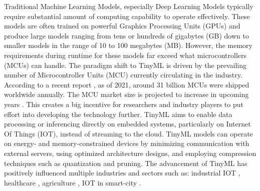 \documentclass[twocolumn]{article}
\begin{document}
Traditional Machine Learning Models, especially Deep Learning Models typically require substantial amount of computing capability to operate effectively. These models are often trained on powerful Graphics Processing Units (GPUs) and produce large models ranging from tens or hundreds of gigabytes (GB) down to smaller models in the range of 10 to 100 megabytes (MB). However, the memory requirements during runtime for these models far exceed what microcontrollers (MCUs) can handle.
The paradigm shift to TinyML is driven by the prevailing number of Microcontroller Units (MCU) currently circulating in the industry. According to a recent report \cite{noauthor_microcontroller_nodate,grandviewresearch_research_2023}, as of 2021, around 31 billion MCUs were shipped worldwide annually. The MCU market size is projected to increase in upcoming years \cite{noauthor_microcontroller_nodate}. This creates a big incentive for researchers and industry players to put effort into developing the technology further.
TinyML aims to enable data processing or inferencing directly on embedded systems, particularly on Internet Of Things (IOT), instead of streaming to the cloud. TinyML models can operate on energy- and memory-constrained devices by minimizing communication with external servers, using optimized architecture designs, and employing compression techniques such as quantization and pruning. The advancement of TinyML has positively influenced multiple industries and sectors such as: industrial IOT \cite{ray_review_2022}, healthcare \cite{bhamare_chapter_2024}, agriculture \cite{tsoukas_tinyml-based_2022}, IOT in smart-city \cite{hussein_original_2024,ray_review_2022}. \\[0.25cm]
\end{document}
